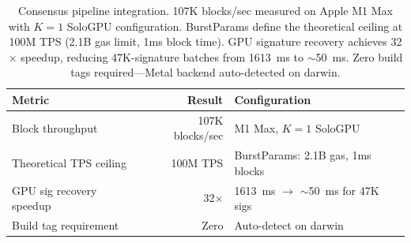 \begin{table}[h]
\centering
\small
\begin{tabular}{lrl}
\toprule
\textbf{Metric} & \textbf{Result} & \textbf{Configuration} \\
\midrule
Block throughput         & 107K blocks/sec     & M1 Max, $K{=}1$ SoloGPU \\
Theoretical TPS ceiling  & 100M TPS            & BurstParams: 2.1B gas, 1ms blocks \\
GPU sig recovery speedup & 32$\times$          & \SI{1613}{ms} $\to$ $\sim$\SI{50}{ms} for 47K sigs \\
Build tag requirement    & Zero                & Auto-detect on darwin \\
\bottomrule
\end{tabular}
\caption{Consensus pipeline integration. 107K blocks/sec measured on Apple M1 Max
with $K{=}1$ SoloGPU configuration. BurstParams define the theoretical ceiling at
100M TPS (2.1B gas limit, 1ms block time). GPU signature recovery achieves
32$\times$ speedup, reducing 47K-signature batches from \SI{1613}{ms} to
$\sim$\SI{50}{ms}. Zero build tags required---Metal backend auto-detected on darwin.}
\label{tab:consensus}
\end{table}

